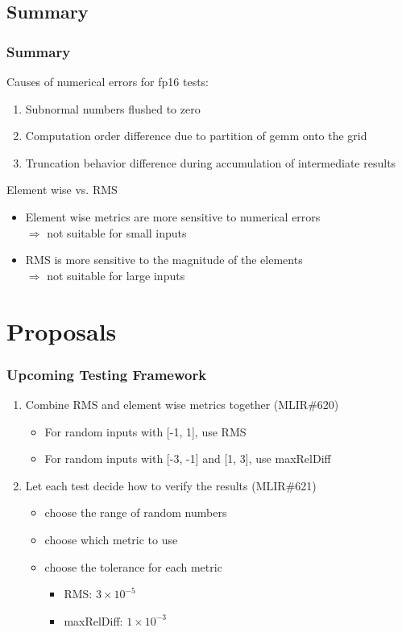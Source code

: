 \documentclass[t, pdftex, aspectratio=169]{beamer}  %
\begin{document}
\subsection{Summary}
\begin{frame}
  \frametitle{Summary}

  Causes of numerical errors for fp16 tests:
  \begin{enumerate}
  \item Subnormal numbers flushed to zero
  \item Computation order difference due to partition of gemm onto the grid
  \item Truncation behavior difference during accumulation of intermediate results
  \end{enumerate}

  Element wise vs. RMS
  \begin{itemize}
  \item Element wise metrics are more sensitive to numerical errors\\
    $\Rightarrow$ not suitable for small inputs
  \item RMS is more sensitive to the magnitude of the elements\\
    $\Rightarrow$ not suitable for large inputs
  \end{itemize}
\end{frame}

\section{Proposals}
\begin{frame}
  \frametitle{Upcoming Testing Framework}
  \begin{enumerate}
  \item Combine RMS and element wise metrics together (MLIR\#620)
    \begin{itemize}
    \item For random inputs with [-1, 1], use RMS
    \item For random inputs with [-3, -1] and [1, 3], use maxRelDiff
    \end{itemize}
  \item Let each test decide how to verify the results (MLIR\#621)
    \begin{itemize}
    \item choose the range of random numbers
    \item choose which metric to use
    \item choose the tolerance for each metric
      \begin{itemize}
      \item RMS: $3\times10^{-5}$
      \item maxRelDiff: $1\times10^{-3}$
      \end{itemize}
    \end{itemize}
  \end{enumerate}
\end{frame}
\end{document}
